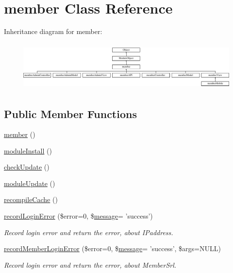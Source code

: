 \hypertarget{classmember}{\section{member Class Reference}
\label{classmember}
}
Inheritance diagram for member\-:\begin{figure}[H]
\begin{center}
\leavevmode
\includegraphics[height=2.580645cm]{classmember}
\end{center}
\end{figure}
\subsection*{Public Member Functions}
\begin{DoxyCompactItemize}
\item 
\hyperlink{classmember_a4153f13605eac8adf8dde89ee7d18c02}{member} ()
\item 
\hyperlink{classmember_a5834fa338d03eedcb5e84bb8ccac305b}{module\-Install} ()
\item 
\hyperlink{classmember_ad28f96bfab17efa94a9f2607a8b42a3d}{check\-Update} ()
\item 
\hyperlink{classmember_a72b7382e568644ccadb69b67e4504086}{module\-Update} ()
\item 
\hyperlink{classmember_ab5bc32f3821f7cba98e34703679c69ee}{recompile\-Cache} ()
\item 
\hyperlink{classmember_a557d0a329f29c5490a53c6e5a58dcab9}{record\-Login\-Error} (\$error=0, \$\hyperlink{classmessage}{message}= 'success')
\begin{DoxyCompactList}\small\item\em Record login error and return the error, about I\-Paddress. \end{DoxyCompactList}\item 
\hyperlink{classmember_a629cfb29393b629f0b39e4467a3d44d4}{record\-Member\-Login\-Error} (\$error=0, \$\hyperlink{classmessage}{message}= 'success', \$args=N\-U\-L\-L)
\begin{DoxyCompactList}\small\item\em Record login error and return the error, about Member\-Srl. \end{DoxyCompactList}\end{DoxyCompactItemize}
